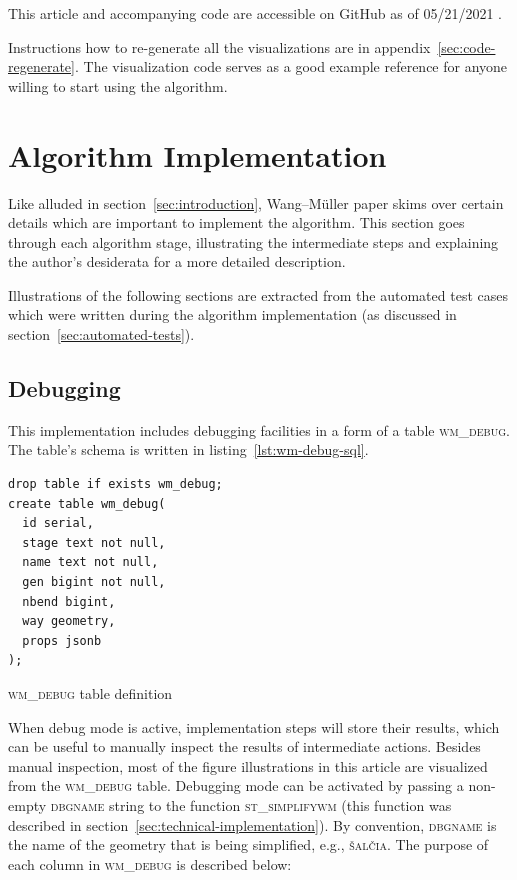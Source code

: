 \documentclass[a4paper]{article}
\newcommand{\WM}{Wang--M{\"u}ller}
\begin{document}
This article and accompanying code are accessible on GitHub as of 05/21/2021
\cite{wmsql}.

Instructions how to re-generate all the visualizations are in
appendix~\ref{sec:code-regenerate}. The visualization code serves as a good
example reference for anyone willing to start using the algorithm.

\section{Algorithm Implementation}

Like alluded in section~\ref{sec:introduction}, {\WM} paper skims over
certain details which are important to implement the algorithm. This section
goes through each algorithm stage, illustrating the intermediate steps and
explaining the author's desiderata for a more detailed description.

Illustrations of the following sections are extracted from the automated test
cases which were written during the algorithm implementation (as discussed in
section~\ref{sec:automated-tests}).

\subsection{Debugging}
\label{sec:debugging}

This implementation includes debugging facilities in a form of a table
\textsc{wm\_debug}. The table's schema is written in
listing~\ref{lst:wm-debug-sql}.

\begin{listing}[h]
    \begin{verbatim}
drop table if exists wm_debug;
create table wm_debug(
  id serial,
  stage text not null,
  name text not null,
  gen bigint not null,
  nbend bigint,
  way geometry,
  props jsonb
);
    \end{verbatim}
    \caption{\textsc{wm\_debug} table definition}
    \label{lst:wm-debug-sql}
\end{listing}

When debug mode is active, implementation steps will store their results, which
can be useful to manually inspect the results of intermediate actions. Besides
manual inspection, most of the figure illustrations in this article are
visualized from the \textsc{wm\_debug} table. Debugging mode can be activated
by passing a non-empty \textsc{dbgname} string to the function
\textsc{st\_simplifywm} (this function was described in
section~\ref{sec:technical-implementation}). By convention, \textsc{dbgname} is
the name of the geometry that is being simplified, e.g., \textsc{šalčia}. The
purpose of each column in \textsc{wm\_debug} is described below:
\end{document}
